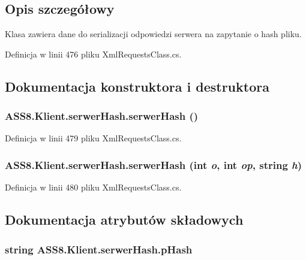 \subsection{Opis szczegółowy}
Klasa zawiera dane do serializacji odpowiedzi serwera na zapytanie o hash pliku. 



Definicja w linii 476 pliku XmlRequestsClass.cs.

\subsection{Dokumentacja konstruktora i destruktora}
\hypertarget{a00024_79c7996d2e3af0a5ccceed0a8571f365}{
\subsubsection[{serwerHash}]{\setlength{\rightskip}{0pt plus 5cm}ASS8.Klient.serwerHash.serwerHash ()}}
\label{dc/de2/a00024_79c7996d2e3af0a5ccceed0a8571f365}




Definicja w linii 479 pliku XmlRequestsClass.cs.\hypertarget{a00024_c5d6f7f180298714d66df1b3651de900}{
\subsubsection[{serwerHash}]{\setlength{\rightskip}{0pt plus 5cm}ASS8.Klient.serwerHash.serwerHash (int {\em o}, \/  int {\em op}, \/  string {\em h})}}
\label{dc/de2/a00024_c5d6f7f180298714d66df1b3651de900}




Definicja w linii 480 pliku XmlRequestsClass.cs.

\subsection{Dokumentacja atrybutów składowych}
\hypertarget{a00024_e3111f0da2c2e6180ae82949844b5111}{
\subsubsection[{pHash}]{\setlength{\rightskip}{0pt plus 5cm}string {\bf ASS8.Klient.serwerHash.pHash}}}
\label{dc/de2/a00024_e3111f0da2c2e6180ae82949844b5111}




